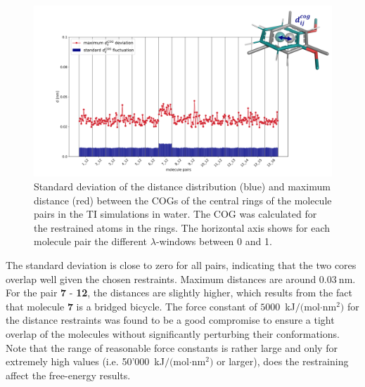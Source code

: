 \begin{figure}[h!]
    \centering
    \includegraphics[width=\textwidth]{fig/results/pairwise/sampling/TI_pairwise_dCOG_fluctuations.png}
    \caption{Standard deviation of the distance distribution (blue) and maximum distance (red) between the COGs of the central rings of the molecule pairs in the TI simulations in water. The COG was calculated for the restrained atoms in the rings. The horizontal axis shows for each molecule pair the different $\lambda$-windows between 0 and 1.}
    \label{fig: pairCOGDist_TIStarMa}
\end{figure}


The standard deviation is close to zero for all pairs, indicating that the two cores overlap well given the chosen restraints. Maximum distances are around $0.03~$nm. For the pair \textbf{7} - \textbf{12}, the distances are slightly higher, which results from the fact that molecule \textbf{7} is a bridged bicycle. The force constant of $5000$~kJ$/($mol$\cdot$nm$^2)$ for the distance restraints was found to be a good compromise to ensure a tight overlap of the molecules without significantly perturbing their conformations. Note that the range of reasonable force constants is rather large and only for extremely high values (i.e. 50'000~kJ$/($mol$\cdot$nm$^2)$ or larger), does the restraining affect the free-energy results.


